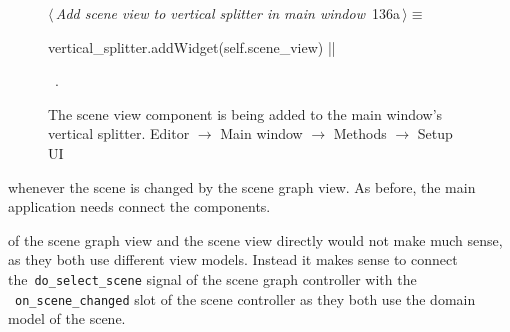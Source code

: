 \documentclass[%
    a4paper,    %
    justified,  %
    nobib,      %
    openany     %
]{tufte-book}
\makeatletter
\renewcommand{\label}[1]{\@tufte@label{##1}}%
\makeatother
\begin{document}
\begin{figure}[!htbp]
\begin{flushleft} \small
\begin{minipage}{\linewidth}\label{scrap83}\raggedright\small
{} $\langle\,${\itshape Add scene view to vertical splitter in main window}\nobreak\ {\footnotesize {136a}}$\,\rangle\equiv$
\vspace{-1ex}
\begin{pythoncode}
vertical_splitter.addWidget(self.scene_view)
|\NWsep|
\end{pythoncode}
\vspace{1.5ex}
\footnotesize
\begin{list}{}{\setlength{\itemsep}{-\parsep}\setlength{\itemindent}{-\leftmargin}}
\item \NWtxtMacroRefIn\ .

\item{}
\end{list}
\end{minipage}\vspace{4ex}
\end{flushleft}
\caption{The scene view component is being added to the main window's vertical
  splitter.
  \newline{}\newline{}Editor $\rightarrow$ Main window $\rightarrow$
  Methods $\rightarrow$ Setup UI}
\end{figure}

 whenever the scene is
changed by the scene graph view. As before, the main application needs connect
the components.

 of the scene graph view and the scene
view directly would not make much sense, as they both use different view models.
Instead it makes sense to connect the~\verb=do_select_scene= signal of the scene
graph controller with the ~\verb=on_scene_changed= slot of the scene controller
as they both use the domain model of the scene.
\end{document}

